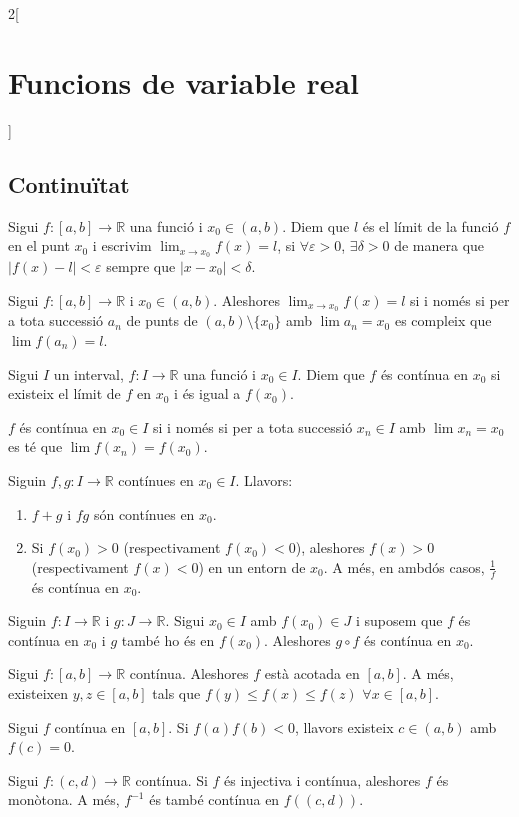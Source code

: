 \documentclass[class=article,10pt,crop=false]{standalone}
\begin{document}
\begin{multicols}{2}[\section{Funcions de variable real}]
\subsection{Continuïtat}
\begin{definition}
Sigui $f:[a,b]\rightarrow\mathbb{R}$ una funció i $x_0\in(a,b)$. Diem que $l$ és el límit de la funció $f$ en el punt $x_0$ i escrivim $\lim_{x\to x_0}f(x)=l$, si $\forall\varepsilon>0$, $\exists\delta>0$ de manera que $|f(x)-l|<\varepsilon$ sempre que $|x-x_0|<\delta$.
\end{definition}
\begin{lemma}
Sigui $f:[a,b]\rightarrow\mathbb{R}$ i $x_0\in(a,b)$. Aleshores $\lim_{x\to x_0}f(x)=l$ si i només si per a tota successió $a_n$ de punts de $(a,b)\setminus\{x_0\}$ amb $\lim a_n=x_0$ es compleix que $\lim f(a_n)=l$.
\end{lemma}
\begin{definition}
Sigui $I$ un interval, $f:I\rightarrow\mathbb{R}$ una funció i $x_0\in I$. Diem que $f$ és contínua en $x_0$ si existeix el límit de $f$ en $x_0$ i és igual a $f(x_0)$.
\end{definition}
\begin{lemma}
$f$ és contínua en $x_0\in I$ si i només si per a tota successió $x_n\in I$ amb $\lim x_n=x_0$ es té que $\lim f(x_n)=f(x_0)$.
\end{lemma}
\begin{prop}
Siguin $f,g:I\rightarrow \mathbb{R}$ contínues en $x_0\in I$. Llavors:
\begin{enumerate}
    \item $f+g$ i $fg$ són contínues en $x_0$.
    \item Si $f(x_0)>0$ (respectivament $f(x_0)<0$), aleshores $f(x)>0$ (respectivament $f(x)<0$) en un entorn de $x_0$. A més, en ambdós casos, $\frac{1}{f}$ és contínua en $x_0$.
\end{enumerate}
\end{prop}
\begin{prop}
Siguin $f:I\rightarrow\mathbb{R}$ i $g:J\rightarrow\mathbb{R}$. Sigui $x_0\in I$ amb $f(x_0)\in J$ i suposem que $f$ és contínua en $x_0$ i $g$ també ho és en $f(x_0)$. Aleshores $g\circ f$ és contínua en $x_0$.
\end{prop}
\begin{theorem}
Sigui $f:[a,b]\rightarrow\mathbb{R}$ contínua. Aleshores $f$ està acotada en $[a,b]$. A més, existeixen $y,z\in[a,b]$ tals que $f(y)\leq f(x)\leq f(z)$ $\forall x\in [a,b]$. 
\end{theorem}
\begin{theorem}
Sigui $f$ contínua en $[a,b]$. Si $f(a)f(b)<0$, llavors existeix $c\in(a,b)$ amb $f(c)=0$. 
\end{theorem}
\begin{theorem}
Sigui $f:(c,d)\rightarrow\mathbb{R}$ contínua. Si $f$ és injectiva i contínua, aleshores $f$ és monòtona. A més, $f^{-1}$ és també contínua en $f((c,d))$.
\end{theorem}

\end{multicols}
\end{document}
